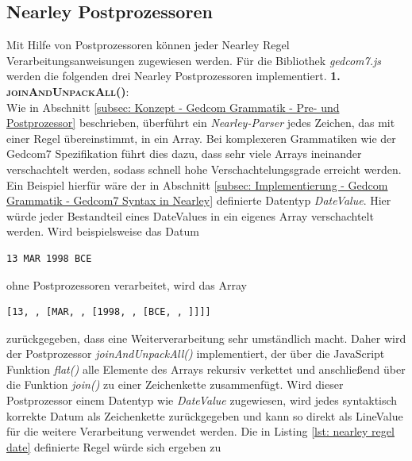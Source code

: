 \subsection{Nearley Postprozessoren}
\label{subsec: Implementierung - Gedcom Grammatik - Nearley Postprozessoren}
 Mit Hilfe von Postprozessoren können jeder Nearley Regel Verarbeitungsanweisungen zugewiesen werden. Für die Bibliothek \textit{gedcom7.js} werden die folgenden drei Nearley Postprozessoren implementiert.
\newpage
\textsc{\textbf{1. joinAndUnpackAll()}:} \vspace{0.5em} \\
Wie in Abschnitt \ref{subsec: Konzept - Gedcom Grammatik - Pre- und Postprozessor} beschrieben, überführt ein \textit{Nearley-Parser} jedes Zeichen, das mit einer Regel übereinstimmt, in ein Array. Bei komplexeren Grammatiken wie der Gedcom7 Spezifikation führt dies dazu, dass sehr viele Arrays ineinander verschachtelt werden, sodass schnell hohe Verschachtelungsgrade erreicht werden. Ein Beispiel hierfür wäre der in Abschnitt \ref{subsec: Implementierung - Gedcom Grammatik - Gedcom7 Syntax in Nearley} definierte Datentyp \textit{DateValue}. Hier würde jeder Bestandteil eines DateValues in ein eigenes Array verschachtelt werden. Wird beispielsweise das Datum 
\begin{lstlisting}[frame=none]
			 	13 MAR 1998 BCE
\end{lstlisting}
ohne Postprozessoren verarbeitet, wird das Array
\begin{lstlisting}[frame=none]
		[13, , [MAR, , [1998, , [BCE, , ]]]]
\end{lstlisting}
zurückgegeben, dass eine Weiterverarbeitung sehr umständlich macht. Daher wird der Postprozessor \textit{joinAndUnpackAll()} implementiert, der über die JavaScript Funktion \textit{flat()} alle Elemente des Arrays rekursiv verkettet und anschließend über die Funktion \textit{join()} zu einer Zeichenkette zusammenfügt. Wird dieser Postprozessor einem Datentyp wie \textit{DateValue} zugewiesen, wird jedes syntaktisch korrekte Datum als Zeichenkette zurückgegeben und kann so direkt als LineValue für die weitere Verarbeitung verwendet werden. Die in Listing \ref{lst: nearley regel date} definierte Regel würde sich ergeben zu
\vspace{1em}
\vspace{1em}

